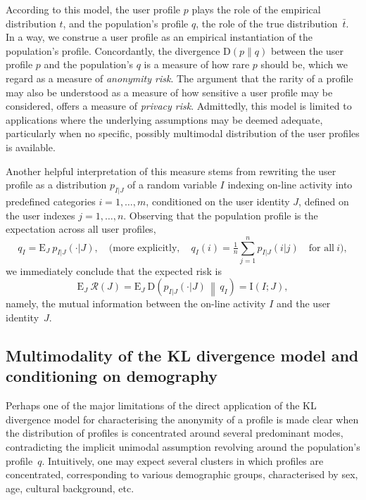 According to this model, the user profile $p$ plays the role of the empirical distribution $t$, and the population's profile $q$, the role of the true distribution~$\bar{t}$. In a way, we construe a user profile as an empirical instantiation of the population's profile. Concordantly, the divergence $\text{D}(p\|q)$ between the user profile $p$ and the population's $q$ is a measure of how rare $p$ should be, which we regard as a measure of \emph{anonymity risk}. The argument that the rarity of a profile may also be understood as a measure of how sensitive a user profile may be considered, offers a measure of \emph{privacy risk}. Admittedly, this model is limited to applications where the underlying assumptions may be deemed adequate, particularly when no specific, possibly multimodal distribution of the user profiles is available.

Another helpful interpretation of this measure stems from rewriting the user profile as a distribution $p_{I|J}$ of a random variable $I$ indexing on-line activity into predefined categories $i=1,\dots,m$, conditioned on the user identity $J$, defined on the user indexes $j=1,\dots,n$. Observing that the population profile is the expectation across all user profiles,
$$q_I=\text{E}_J\:p_{I|J}(\cdot|J),\quad\text{(more explicitly},\quad q_I(i)=\tfrac{1}{n}\sum_{j=1}^n p_{I|J}(i|j)\quad\text{for all}\ i\text{)},$$
we immediately conclude that the expected risk is
$$\text{E}_J\:\mathcal{R}(J)=\text{E}_J\:\text{D}\left(p_{I|J}(\cdot|J)\,\middle\|\,q_I\right)=\text{I}(I;J),$$
namely, the mutual information between the on-line activity $I$ and the user identity~$J$.

\subsection{Multimodality of the KL divergence model and conditioning on demography}
\label{sec:1.2}
Perhaps one of the major limitations of the direct application of the KL divergence model for characterising the anonymity of a profile is made clear when the distribution of profiles is concentrated around several predominant modes, contradicting the implicit unimodal assumption revolving around the population's profile~$q$. Intuitively, one may expect several clusters in which profiles are concentrated, corresponding to various demographic groups, characterised by sex, age, cultural background, etc.

